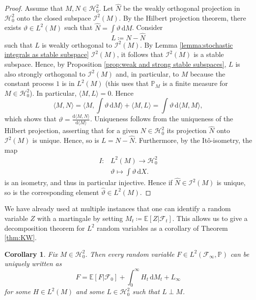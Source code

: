 \documentclass[11pt,a4paper,twoside,openany]{report}
\numberwithin{equation}{section}
\newcommand{\diff}{\mathrm{d}}
\theoremstyle{plain} %
\newtheorem{corollary}[theorem]{Corollary}
\theoremstyle{definition} %
\theoremstyle{remark} %
\begin{document}
\begin{proof}
    Assume that \(M,N\in\mathcal{H}_0^2\). Let \(\hat{N}\) be the weakly orthogonal projection in \(\mathcal{H}_0^2\) onto the closed subspace \(\mathcal{I}^2(M)\). By the Hilbert projection theorem, there exists \(\vartheta\in L^2(M)\) such that \(\hat{N}=\int \vartheta\,\diff M\). Consider
    \begin{equation*}
        L\coloneqq N-\hat{N}
    \end{equation*}
    such that \(L\) is weakly orthogonal to \(\mathcal{I}^2(M)\). By Lemma \ref{lemma:stochastic integrals as stable subspace} \(\mathcal{I}^2(M)\), it follows that \(\mathcal{I}^2(M)\) is a stable subspace. Hence, by Proposition \ref{prop:weak and strong stable subspaces}, \(L\) is also strongly orthogonal to \(\mathcal{I}^2(M)\) and, in particular, to \(M\) because the constant process \(1\) is in \(L^2(M)\) (this uses that \(\mathbb{P}_M\) is a finite measure for \(M\in\mathcal{H}_0^2\)). In particular, \(\langle M,L\rangle=0\). Hence 
    \begin{equation*}
        \langle M,N\rangle =\langle M,\int \vartheta\,\diff M\rangle+\langle M,L\rangle =\int \vartheta\,\diff \langle M,M\rangle,
    \end{equation*}
    which shows that \(\vartheta=\frac{\diff \langle M,N\rangle}{\diff \langle M\rangle}\). Uniqueness follows from the uniqueness of the Hilbert projection, asserting that for a given \(N\in\mathcal{H}^2_0\) its projection \(\hat{N}\) onto \(\mathcal{I}^2(M)\) is unique. Hence, so is \(L=N-\hat{N}\). Furthermore, by the Itô-isometry, the map
    \begin{align*}
        I:&L^2(M)\to\mathcal{H}^2_0
        \\&\vartheta\mapsto \int \vartheta\,\diff X.
    \end{align*}
    is an isometry, and thus in particular injective. Hence if \(\hat{N}\in \mathcal{I}^2(M)\) is unique, so is the corresponding element \(\hat{\vartheta}\in L^2(M)\).
\end{proof}
We have already used at multiple instances that one can identify a random variable \(Z\) with a martingale by setting \(M_t\coloneqq\mathbb{E}[Z|\mathcal{F}_t]\). This allows us to give a decomposition theorem for \(L^2\) random variables as a corollary of Theorem \ref{thm:KW}. 
\begin{corollary}\label{cor:random variable level Kunita Watanabe}
    Fix \(M\in\mathcal{H}_{0}^2\). Then every random variable \(F\in L^2(\mathcal{F}_{\infty},\mathbb{P})\) can be uniquely written as 
    \begin{equation*}
        F = \mathbb{E}[F|\mathcal{F}_0]+\int_0^{\infty}H_t\,\diff M_t+L_{\infty}
    \end{equation*}
    for some \(H\in L^2(M)\) and some \(L\in \mathcal{H}_{0}^2\) such that \(L\perp M\).
\end{corollary}
\end{document}
